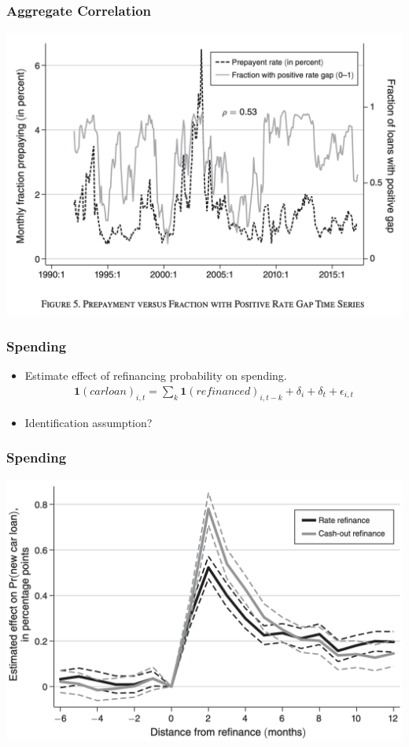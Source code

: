 \documentclass[english,xcolor=svgnames]{beamer}
\begin{document}
\begin{frame}
    \frametitle{Aggregate Correlation}
    \begin{center}
    	\includegraphics[scale=0.3]{figures/BMTVFIG4.png}	
    \end{center}
\end{frame}

\begin{frame}
    \frametitle{Spending}
    \begin{itemize}
    	\item Estimate effect of refinancing probability on spending.
    	\begin{align*}
    	\bm{1}(carloan)_{i,t} = \sum_k \bm{1}(refinanced)_{i,t-k}  + \delta_i + \delta_t + \epsilon_{i,t}
    \end{align*}
    \item Identification assumption?
    \end{itemize}
\end{frame}


\begin{frame}
    \frametitle{Spending}
    \begin{center}
    	\includegraphics[scale=0.3]{figures/BMTVFIG5.png}	
    \end{center}
\end{frame}
\end{document}
